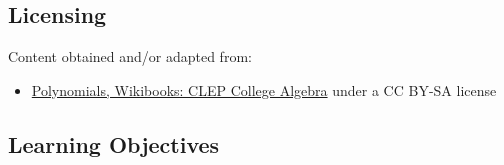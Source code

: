 \subsection{Licensing}
\label{sss:lice-7352}




Content obtained and/or adapted from:



\begin{itemize}
    \item \href{https://en.wikibooks.org/wiki/CLEP_College_Algebra/Polynomials}{Polynomials, Wikibooks: CLEP College Algebra} under a CC BY-SA license
\end{itemize}


\subsection{Learning Objectives}
\label{ssec:lear-fe6e}


